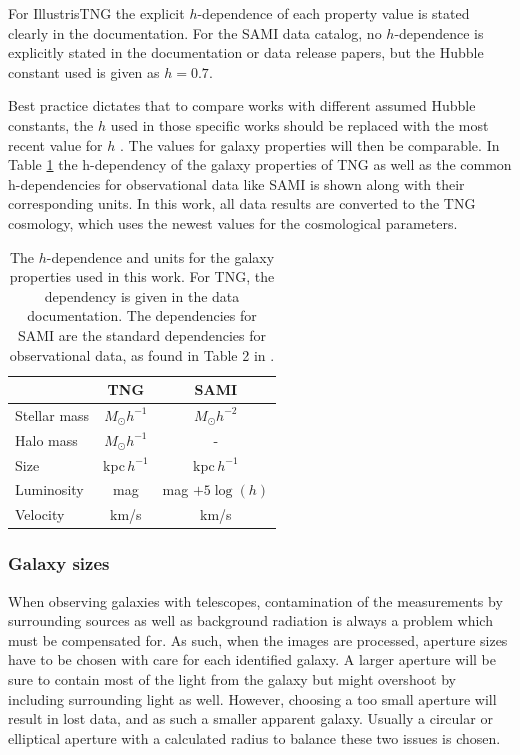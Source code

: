 For IllustrisTNG the explicit $h$-dependence of each property value is stated clearly in the documentation. For the SAMI data catalog, no $h$-dependence is explicitly stated in the documentation or data release papers, but the Hubble constant used is given as $h = 0.7$.

Best practice dictates that to compare works with different assumed Hubble constants, the $h$ used in those specific works should be replaced with the most recent value for $h$ \parencite{Croton2013}. The values for galaxy properties will then be comparable. In Table \ref{h_dependence} the h-dependency of the galaxy properties of TNG as well as the common h-dependencies for observational data like SAMI is shown along with their corresponding units. In this work, all data results are converted to the TNG cosmology, which uses the newest values for the cosmological parameters.

\begin{table}
\begin{center}
\caption{The $h$-dependence and units for the galaxy properties used in this work. For TNG, the dependency is given in the data documentation. The dependencies for SAMI are the standard dependencies for observational data, as found in Table 2 in \textcite{Croton2013}.}
\label{h_dependence}
\begin{tabular}{ l| c c }
 \hline
 \hline
   & TNG & SAMI \\
 \hline
 Stellar mass & $M_{\odot}h^{-1}$ & $M_{\odot}h^{-2}$ \\ 
 Halo mass & $M_{\odot}h^{-1}$ & - \\
 Size & kpc$\,h^{-1}$ & kpc$\,h^{-1}$ \\
 Luminosity & mag & mag $+5\log(h)$ \\
 Velocity & km/s & km/s  \\ 

 \hline 
\end{tabular}
\end{center}
\end{table}

\subsubsection{Galaxy sizes} \label{galaxy_size}
When observing galaxies with telescopes, contamination of the measurements by surrounding sources as well as background radiation is always a problem which must be compensated for. As such, when the images are processed, aperture sizes have to be chosen with care for each identified galaxy. A larger aperture will be sure to contain most of the light from the galaxy but might overshoot by including surrounding light as well. However, choosing a too small aperture will result in lost data, and as such a smaller apparent galaxy. Usually a circular or elliptical aperture with a calculated radius to balance these two issues is chosen.

